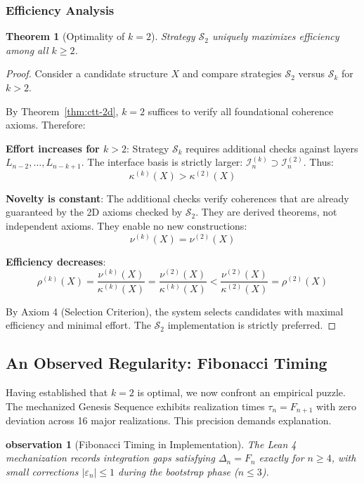 \documentclass[11pt]{article}
\theoremstyle{definition}
\theoremstyle{plain}
\newtheorem{theorem}{Theorem}
\newtheorem{observation}{observation}
\theoremstyle{remark}
\begin{document}
\subsubsection{Efficiency Analysis}

\begin{theorem}[Optimality of $k=2$]\label{thm:k2-optimal}
Strategy $\mathcal{S}_2$ uniquely maximizes efficiency among all $k \geq 2$.
\end{theorem}

\begin{proof}
Consider a candidate structure $X$ and compare strategies $\mathcal{S}_2$ versus $\mathcal{S}_k$ for $k > 2$.

By Theorem~\ref{thm:ctt-2d}, $k=2$ suffices to verify all foundational coherence axioms. Therefore:

\textbf{Effort increases for $k>2$}: Strategy $\mathcal{S}_k$ requires additional checks against layers $L_{n-2}, \ldots, L_{n-k+1}$. The interface basis is strictly larger: $\mathcal{I}_n^{(k)} \supset \mathcal{I}_n^{(2)}$. Thus:
\[
\kappa^{(k)}(X) > \kappa^{(2)}(X)
\]

\textbf{Novelty is constant}: The additional checks verify coherences that are already guaranteed by the 2D axioms checked by $\mathcal{S}_2$. They are derived theorems, not independent axioms. They enable no new constructions:
\[
\nu^{(k)}(X) = \nu^{(2)}(X)
\]

\textbf{Efficiency decreases}:
\[
\rho^{(k)}(X) = \frac{\nu^{(k)}(X)}{\kappa^{(k)}(X)} = \frac{\nu^{(2)}(X)}{\kappa^{(k)}(X)} < \frac{\nu^{(2)}(X)}{\kappa^{(2)}(X)} = \rho^{(2)}(X)
\]

By Axiom 4 (Selection Criterion), the system selects candidates with maximal efficiency and minimal effort. The $\mathcal{S}_2$ implementation is strictly preferred.
\end{proof}

\subsection{An Observed Regularity: Fibonacci Timing}

Having established that $k=2$ is optimal, we now confront an empirical puzzle. 
The mechanized Genesis Sequence exhibits realization times $\tau_n = F_{n+1}$ 
with zero deviation across 16 major realizations. This precision demands explanation.

\begin{observation}[Fibonacci Timing in Implementation]
The Lean 4 mechanization records integration gaps satisfying $\Delta_n = F_n$ 
exactly for $n \geq 4$, with small corrections $|\varepsilon_n| \leq 1$ during 
the bootstrap phase ($n \leq 3$).
\end{observation}
\end{document}
